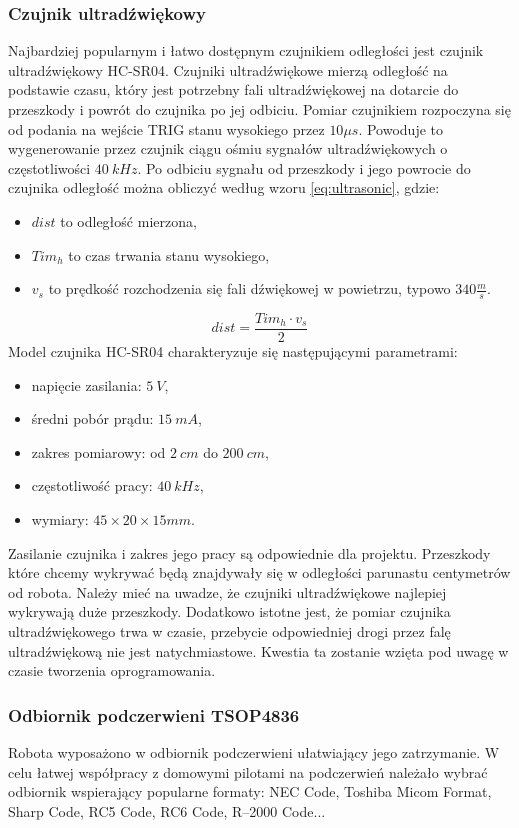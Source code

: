 \documentclass[11pt]{article}
\begin{document}
\subsubsection{Czujnik ultradźwiękowy}
Najbardziej popularnym i łatwo dostępnym czujnikiem odległości jest czujnik ultradźwiękowy HC-SR04.
Czujniki ultradźwiękowe mierzą odległość na podstawie czasu, który jest potrzebny fali ultradźwiękowej na dotarcie do przeszkody i powrót do czujnika po jej odbiciu.
Pomiar czujnikiem rozpoczyna się od podania na wejście TRIG stanu wysokiego przez $ 10 \mu s $. Powoduje to wygenerowanie przez czujnik ciągu ośmiu sygnałów ultradźwiękowych o częstotliwości $ 40\ kHz $. Po odbiciu sygnału od przeszkody i jego powrocie do czujnika odległość można obliczyć według wzoru \ref{eq:ultrasonic}, gdzie:

\begin{itemize}
	\item $ dist $ to odległość mierzona,
	\item $ Tim_h $ to czas trwania stanu wysokiego, 
	\item $ v_s $ to prędkość rozchodzenia się fali dźwiękowej w powietrzu, typowo $ 340 \frac{m}{s} $.
\end{itemize}
\begin{equation}
\label{eq:ultrasonic}
	dist = \frac{Tim_h \cdot v_s}{2}
\end{equation}
Model czujnika HC-SR04 charakteryzuje się następującymi parametrami:
\begin{itemize}
	\item napięcie zasilania: $ 5\ V $,
	\item średni pobór prądu: $ 15\ mA $,
	\item zakres pomiarowy: od $ 2\ cm $ do $ 200\ cm $,
	\item częstotliwość pracy: $ 40\ kHz $,
	\item wymiary: $ 45 \times 20 \times 15 mm $.
\end{itemize}
Zasilanie czujnika i zakres jego pracy są odpowiednie dla projektu.
Przeszkody które chcemy wykrywać będą znajdywały się w odległości parunastu centymetrów od robota.
Należy mieć na uwadze, że czujniki ultradźwiękowe najlepiej wykrywają duże przeszkody. 
Dodatkowo istotne jest, że pomiar czujnika ultradźwiękowego trwa w czasie, przebycie odpowiedniej drogi przez falę ultradźwiękową nie jest natychmiastowe.
Kwestia ta zostanie wzięta pod uwagę w czasie tworzenia oprogramowania.

\subsubsection{Odbiornik podczerwieni TSOP4836}
Robota wyposażono w odbiornik podczerwieni ułatwiający jego zatrzymanie.
W celu łatwej współpracy z domowymi pilotami na podczerwień należało wybrać odbiornik wspierający popularne formaty: NEC Code, Toshiba Micom Format, Sharp Code, RC5 Code, RC6 Code, R–2000 Code...
\end{document}
